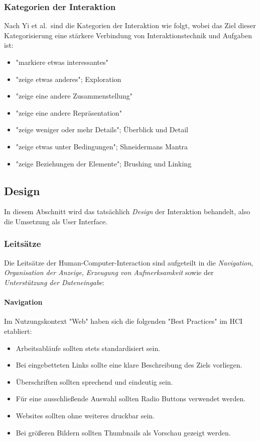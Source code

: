 			\subsubsection{Kategorien der Interaktion}
				Nach Yi et al.~sind die Kategorien der Interaktion wie folgt, wobei das Ziel dieser Kategorisierung eine stärkere Verbindung von Interaktionstechnik und Aufgaben ist:
				\begin{itemize}
					\item {} "markiere etwas interessantes"
					\item {} "zeige etwas anderes"; Exploration
					\item {} "zeige eine andere Zusammenstellung"
					\item {} "zeige eine andere Repräsentation"
					\item {} "zeige weniger oder mehr Details"; Überblick und Detail
					\item {} "zeige etwas unter Bedingungen"; Shneidermans Mantra
					\item {} "zeige Beziehungen der Elemente"; Brushing und Linking
				\end{itemize}

		\subsection{Design}
			In diesem Abschnitt wird das tatsächlich \emph{Design} der Interaktion behandelt, also die Umsetzung als User Interface.

			\subsubsection{Leitsätze}
				Die Leitsätze der Human-Computer-Interaction sind aufgeteilt in die \emph{Navigation}, \emph{Organisation der Anzeige}, \emph{Erzeugung von Aufmerksamkeit} sowie der \emph{Unterstützung der Dateneingabe}:

				\paragraph{Navigation}
					Im Nutzungskontext "Web" haben sich die folgenden "Best Practices" im HCI etabliert:
					\begin{itemize}
						\item Arbeitsabläufe sollten stets standardisiert sein.
						\item Bei eingebetteten Links sollte eine klare Beschreibung des Ziels vorliegen.
						\item Überschriften sollten sprechend und eindeutig sein.
						\item Für eine ausschließende Auswahl sollten Radio Buttons verwendet werden.
						\item Websites sollten ohne weiteres druckbar sein.
						\item Bei größeren Bildern sollten Thumbnails als Vorschau gezeigt werden.
					\end{itemize}

